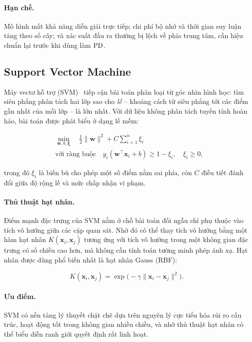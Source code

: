 \paragraph{Hạn chế.} Mô hình mất khả năng diễn giải trực tiếp; chi phí bộ nhớ và
thời gian suy luận tăng theo số cây; và xác suất đầu ra thường bị lệch về phía
trung tâm, cần hiệu chuẩn lại trước khi dùng làm $\mathrm{PD}$.

\subsection{Support Vector Machine}
\label{subsec:svm}

Máy vectơ hỗ trợ (SVM)~\cite{cortes1995,vapnik1998} tiếp cận bài toán phân loại
từ góc nhìn hình học: tìm siêu
phẳng phân tách hai lớp sao cho \textit{lề} -- khoảng cách từ siêu phẳng tới các
điểm gần nhất của mỗi lớp -- là lớn nhất. Với dữ liệu không phân tách tuyến tính
hoàn hảo, bài toán được phát biểu ở dạng lề mềm:

\begin{equation}
\begin{aligned}
&\min_{\bm{w}, b, \bm{\xi}} \quad
  \frac{1}{2}\lVert \bm{w} \rVert^2 + C \sum_{i=1}^{n} \xi_i \\[2pt]
&\text{với ràng buộc} \quad
  y_i(\bm{w}^{\!\top}\bm{x}_i + b) \ge 1 - \xi_i, \quad \xi_i \ge 0,
\end{aligned}
\label{eq:svm-primal}
\end{equation}

trong đó $\xi_i$ là biến bù cho phép một số điểm nằm sai phía, còn $C$ điều tiết
đánh đổi giữa độ rộng lề và mức chấp nhận vi phạm.

\paragraph{Thủ thuật hạt nhân.} Điểm mạnh đặc trưng của SVM nằm ở chỗ bài toán
đối ngẫu chỉ phụ thuộc vào tích vô hướng giữa các cặp quan sát. Nhờ đó có thể
thay tích vô hướng bằng một hàm hạt nhân $K(\bm{x}_i, \bm{x}_j)$ tương ứng với
tích vô hướng trong một không gian đặc trưng có số chiều cao hơn, mà không cần
tính toán tường minh phép ánh xạ. Hạt nhân được dùng phổ biến nhất là hạt nhân
Gauss (RBF):

\begin{equation}
K(\bm{x}_i, \bm{x}_j) = \exp\!\big( -\gamma \lVert \bm{x}_i - \bm{x}_j \rVert^2 \big).
\label{eq:rbf}
\end{equation}

\paragraph{Ưu điểm.} SVM có nền tảng lý thuyết chặt chẽ dựa trên nguyên lý cực
tiểu hóa rủi ro cấu trúc, hoạt động tốt trong không gian nhiều chiều, và nhờ thủ
thuật hạt nhân có thể biểu diễn ranh giới quyết định rất linh hoạt.

